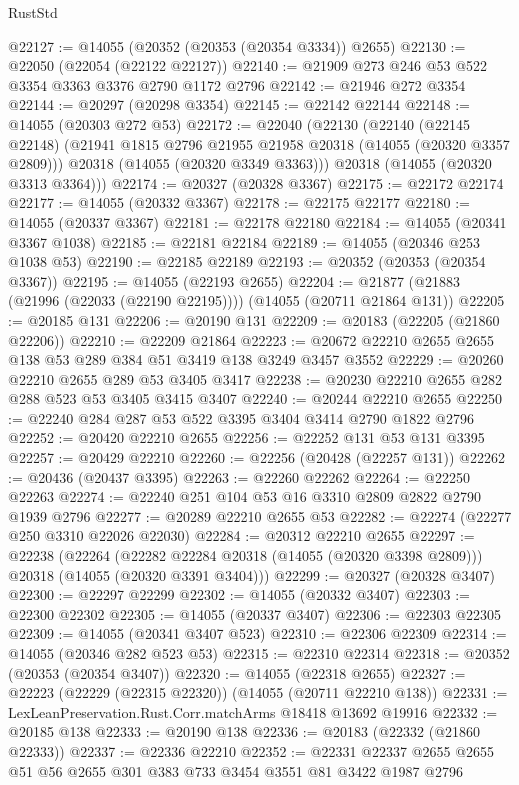 \begin{lexlean}{RustStd}
\begin{coremodule}
@22127 := @14055 (@20352 (@20353 (@20354 @3334)) @2655)
@22130 := @22050 (@22054 (@22122 @22127))
@22140 := @21909 @273 @246 @53 @522 @3354 @3363 @3376 @2790 @1172 @2796
@22142 := @21946 @272 @3354
@22144 := @20297 (@20298 @3354)
@22145 := @22142 @22144
@22148 := @14055 (@20303 @272 @53)
@22172 := @22040
    (@22130
      (@22140
        (@22145 @22148)
        (@21941 @1815 @2796 @21955 @21958 @20318 (@14055 (@20320 @3357 @2809)))
        @20318
        (@14055 (@20320 @3349 @3363)))
      @20318
      (@14055 (@20320 @3313 @3364)))
@22174 := @20327 (@20328 @3367)
@22175 := @22172 @22174
@22177 := @14055 (@20332 @3367)
@22178 := @22175 @22177
@22180 := @14055 (@20337 @3367)
@22181 := @22178 @22180
@22184 := @14055 (@20341 @3367 @1038)
@22185 := @22181 @22184
@22189 := @14055 (@20346 @253 @1038 @53)
@22190 := @22185 @22189
@22193 := @20352 (@20353 (@20354 @3367))
@22195 := @14055 (@22193 @2655)
@22204 := @21877 (@21883 (@21996 (@22033 (@22190 @22195)))) (@14055 (@20711 @21864 @131))
@22205 := @20185 @131
@22206 := @20190 @131
@22209 := @20183 (@22205 (@21860 @22206))
@22210 := @22209 @21864
@22223 := @20672 @22210 @2655 @2655 @138 @53 @289 @384 @51 @3419 @138 @3249 @3457 @3552
@22229 := @20260 @22210 @2655 @289 @53 @3405 @3417
@22238 := @20230 @22210 @2655 @282 @288 @523 @53 @3405 @3415 @3407
@22240 := @20244 @22210 @2655
@22250 := @22240 @284 @287 @53 @522 @3395 @3404 @3414 @2790 @1822 @2796
@22252 := @20420 @22210 @2655
@22256 := @22252 @131 @53 @131 @3395
@22257 := @20429 @22210
@22260 := @22256 (@20428 (@22257 @131))
@22262 := @20436 (@20437 @3395)
@22263 := @22260 @22262
@22264 := @22250 @22263
@22274 := @22240 @251 @104 @53 @16 @3310 @2809 @2822 @2790 @1939 @2796
@22277 := @20289 @22210 @2655 @53
@22282 := @22274 (@22277 @250 @3310 @22026 @22030)
@22284 := @20312 @22210 @2655
@22297 := @22238
    (@22264
      (@22282 @22284 @20318 (@14055 (@20320 @3398 @2809)))
      @20318
      (@14055 (@20320 @3391 @3404)))
@22299 := @20327 (@20328 @3407)
@22300 := @22297 @22299
@22302 := @14055 (@20332 @3407)
@22303 := @22300 @22302
@22305 := @14055 (@20337 @3407)
@22306 := @22303 @22305
@22309 := @14055 (@20341 @3407 @523)
@22310 := @22306 @22309
@22314 := @14055 (@20346 @282 @523 @53)
@22315 := @22310 @22314
@22318 := @20352 (@20353 (@20354 @3407))
@22320 := @14055 (@22318 @2655)
@22327 := @22223 (@22229 (@22315 @22320)) (@14055 (@20711 @22210 @138))
@22331 := LexLeanPreservation.Rust.Corr.matchArms @18418 @13692 @19916
@22332 := @20185 @138
@22333 := @20190 @138
@22336 := @20183 (@22332 (@21860 @22333))
@22337 := @22336 @22210
@22352 := @22331 @22337 @2655 @2655 @51 @56 @2655 @301 @383 @733 @3454 @3551 @81 @3422 @1987 @2796

\end{coremodule}
\end{lexlean}
